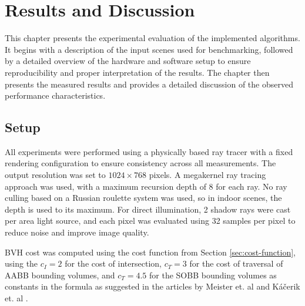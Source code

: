 \chapter{Results and Discussion}
\label{chap:results}

\begin{chapterabstract}
This chapter presents the experimental evaluation of the implemented algorithms. It begins with a description of the input scenes used for benchmarking, followed by a detailed overview of the hardware and software setup to ensure reproducibility and proper interpretation of the results. The chapter then presents the measured results and provides a detailed discussion of the observed performance characteristics.
\end{chapterabstract}

\section{Setup}

All experiments were performed using a physically based ray tracer with a fixed rendering configuration to ensure consistency across all measurements. The output resolution was set to $1024 \times 768$ pixels. A megakernel ray tracing approach was used, with a maximum recursion depth of 8 for each ray. No ray culling based on a Russian roulette system was used, so in indoor scenes, the depth is used to its maximum. For direct illumination, 2 shadow rays were cast per area light source, and each pixel was evaluated using 32 samples per pixel to reduce noise and improve image quality. 

BVH cost was computed using the cost function from Section \ref{sec:cost-function}, using the $c_I=2$ for the cost of intersection, $c_T=3$ for the cost of traversal of AABB bounding volumes, and $c_T=4.5$ for the SOBB bounding volumes as constants in the formula as suggested in the articles by Meister et. al \cite{MB22} and Káčerik et. al \cite{KB25}.

